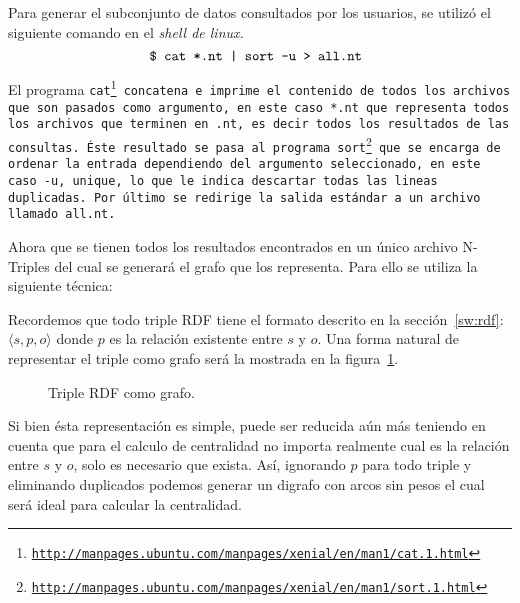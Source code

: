 Para generar el subconjunto de datos consultados por los usuarios, se utilizó el
siguiente comando en el \it{shell} de \it{linux}.
$$\tt{\$ cat *.nt | sort -u > all.nt }$$

El programa \tt{cat}\footnote{
  \url{http://manpages.ubuntu.com/manpages/xenial/en/man1/cat.1.html}} 
concatena e imprime el contenido de todos los archivos que
son pasados como argumento, en este caso \tt{*.nt} que representa todos los
archivos que terminen en \tt{.nt}, es decir todos los resultados de las
consultas.
Éste resultado se pasa al programa \tt{sort}\footnote{
  \url{http://manpages.ubuntu.com/manpages/xenial/en/man1/sort.1.html}}
que se encarga de ordenar la entrada dependiendo del argumento seleccionado, en
este caso \tt{-u}, \tt{unique}, lo que le indica descartar todas las lineas
duplicadas. Por último se redirige la salida estándar a un archivo llamado
\tt{all.nt}.

Ahora que se tienen todos los resultados encontrados en un único archivo
N-Triples del cual se generará el grafo que los representa.
Para ello se utiliza la siguiente técnica:

Recordemos que todo triple RDF tiene el formato descrito en la
sección~\ref{sw:rdf}: $\langle s,p,o\rangle$
donde $p$ es la relación existente entre $s$ y $o$. Una forma natural de
representar el triple como grafo será la mostrada en la
figura~\ref{fig:rdfgraphsimple}.

\begin{figure}[htpb]
  \centering
  \caption{Triple RDF como grafo.}
  \label{fig:rdfgraphsimple}
\end{figure}

Si bien ésta representación es simple, puede ser reducida aún más teniendo en
cuenta que para el calculo de centralidad no importa realmente cual es la
relación entre $s$ y $o$, solo es necesario que exista. Así, ignorando $p$ para
todo triple y eliminando duplicados podemos generar un digrafo con arcos sin
pesos el cual será ideal para calcular la centralidad.

